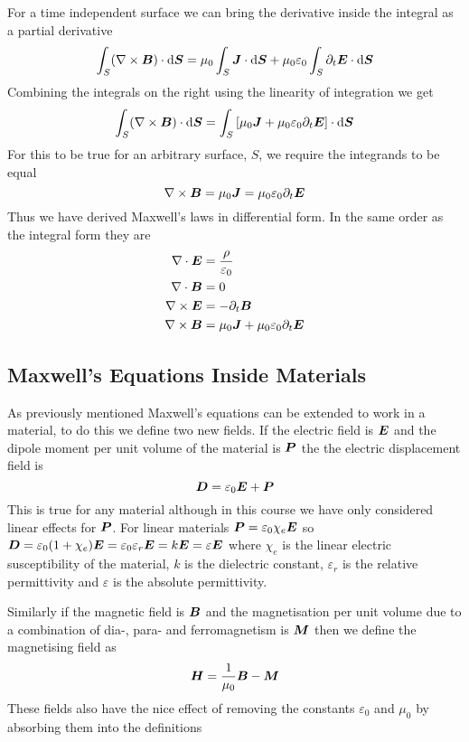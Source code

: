 \documentclass{article}
\begin{document}
    For a time independent surface we can bring the derivative inside the integral as a partial derivative
    \[\int_S(\nabla\times\bm{B})\cdot\dd\bm{S} = \mu_0\int_S\bm{J}\cdot\dd\bm{S} + \mu_0\varepsilon_0\int_S\partial_t\bm{E}\cdot\dd\bm{S}\]
    Combining the integrals on the right using the linearity of integration we get
    \[\int_S(\nabla\times\bm{B})\cdot\dd\bm{S} = \int_S\left[\mu_0\bm{J} + \mu_0\varepsilon_0\partial_t\bm{E}\right]\cdot\dd\bm{S}\]
    For this to be true for an arbitrary surface, \(S\), we require the integrands to be equal
    \[\nabla\times\bm{B} = \mu_0\bm{J} = \mu_0\varepsilon_0\partial_t\bm{E}\]
    Thus we have derived Maxwell's laws in differential form.
    In the same order as the integral form they are
    \begin{align*}
        \nabla\cdot\bm{E} &= \frac{\rho}{\varepsilon_0}\\
        \nabla\cdot\bm{B} &= 0\\
        \nabla\times\bm{E} &= -\partial_t\bm{B}\\
        \nabla\times\bm{B} &= \mu_0\bm{J} + \mu_0\varepsilon_0\partial_t\bm{E}
    \end{align*}
    
    \subsection{Maxwell's Equations Inside Materials}
    As previously mentioned Maxwell's equations can be extended to work in a material, to do this we define two new fields.
    If the electric field is \(\bm{E}\) and the dipole moment per unit volume of the material is \(\bm{P}\) the the electric displacement field is
    \[\bm{D} = \varepsilon_0\bm{E} + \bm{P}\]
    This is true for any material although in this course we have only considered linear effects for \(\bm{P}\).
    For linear materials \(\bm{P} = \varepsilon_0\chi_e\bm{E}\) so \(\bm{D} = \varepsilon_0(1 + \chi_e)\bm{E} = \varepsilon_0\varepsilon_r\bm{E} = k\bm{E} = \varepsilon\bm{E}\) where \(\chi_e\) is the linear electric susceptibility of the material, \(k\) is the dielectric constant, \(\varepsilon_r\) is the relative permittivity and \(\varepsilon\)  is the absolute permittivity.
    
    Similarly if the magnetic field is \(\bm{B}\) and the magnetisation per unit volume due to a combination of dia-, para- and ferromagnetism is \(\bm{M}\) then we define the magnetising field as
    \[\bm{H} = \frac{1}{\mu_0}\bm{B} - \bm{M}\]
    These fields also have the nice effect of removing the constants \(\varepsilon_0\) and \(\mu_0\) by absorbing them into the definitions
    
\end{document}
